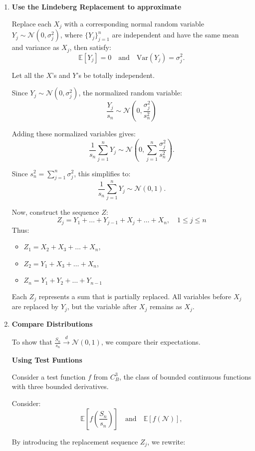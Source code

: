 \begin{itemize}
\begin{enumerate}
\item \textbf{Use the Lindeberg Replacement to approximate}

Replace each \( X_j \) with a corresponding normal random variable \( Y_j \sim \mathcal{N}(0, \sigma_j^2) \), where \( \{Y_j\}_{j=1}^n \) are independent and have the same mean and variance as \( X_j \), then satisfy:
\[
\mathbb{E}[Y_j] = 0 \quad \text{and} \quad \text{Var}(Y_j) = \sigma_j^2.
\]

Let all the \( X\)'s and \( Y\)'s be totally independent. 

Since  \( Y_j \sim \mathcal{N}(0, \sigma_j^2) \), the normalized random variable:
\[
\frac{Y_j}{s_n} \sim \mathcal{N}\left(0, \frac{\sigma_j^2}{s_n^2}\right)
\]

Adding these normalized variables gives:
\[
\frac{1}{s_n} \sum_{j=1}^n Y_j \sim \mathcal{N}\left(0, \sum_{j=1}^n \frac{\sigma_j^2}{s_n^2}\right).
\]

Since \( s_n^2 = \sum_{j=1}^n \sigma_j^2 \), this simplifies to:
\[
\frac{1}{s_n} \sum_{j=1}^n Y_j \sim \mathcal{N}(0, 1).
\]

Now, construct the sequence \( Z\):
\[
Z_j = Y_1 + \dots + Y_{j-1} + X_j + \dots + X_n, \quad 1 \leq j \leq n
\]
Thus:
\begin{itemize}
    \item[] \( Z_1 = X_2 + X_3 + \dots + X_n \),
    \item[] \( Z_2 = Y_1 + X_3 + \dots + X_n \),
    \item[] \( Z_n = Y_1 + Y_2 + \dots + Y_{n-1} \)
\end{itemize}

Each \( Z_j \) represents a sum that is partially replaced. All variables before \( X_j \) are replaced by \( Y_j \), but the variable after \( X_j \) remains as \( X_j \).

\item \textbf{Compare Distributions}

To show that \( \frac{S_n}{s_n} \xrightarrow{d} \mathcal{N}(0, 1) \), we compare their expectations. 

\textbf{Using Test Funtions}

Consider a test function \( f \) from \( C^3_B \), the class of bounded continuous functions with three bounded derivatives.

Consider:
\[
\mathbb{E}\left[f\left(\frac{S_n}{s_n}\right)\right] \quad \text{and} \quad \mathbb{E}\left[f\left(\mathcal{N}\right)\right],
\]

By introducing the replacement sequence \( Z_j \), we rewrite:


\end{enumerate}
\end{itemize}
